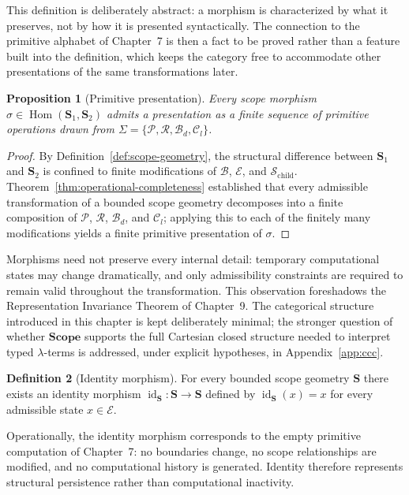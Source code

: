 \documentclass[11pt,twoside,openright]{book}
\numberwithin{equation}{chapter}
\theoremstyle{definition}
\newtheorem{definition}{Definition}[chapter]
\theoremstyle{plain}
\newtheorem{proposition}[definition]{Proposition}
\theoremstyle{remark}
\theoremstyle{definition}
\newcommand{\CatScope}{\mathbf{Scope}}
\newcommand{\Scope}{\mathbf{S}}
\newcommand{\ScopeMorph}{\sigma}
\newcommand{\Alphabet}{\Sigma}
\newcommand{\Pop}{\mathcal{P}}
\newcommand{\Refuse}{\mathcal{R}}
\newcommand{\Bind}{\mathcal{B}_d}
\newcommand{\Collapse}{\mathcal{C}_l}
\newcommand{\ScopeAlphabet}{\Alphabet=\{\Pop,\Refuse,\Bind,\Collapse\}}
\newcommand{\Boundary}{\mathcal{B}}
\newcommand{\Interior}{\mathcal{E}}
\newcommand{\Children}{\mathcal{S}_{\mathrm{child}}}
\DeclareMathOperator{\Hom}{Hom}
\begin{document}
This definition is deliberately abstract: a morphism is characterized by
what it preserves, not by how it is presented syntactically. The
connection to the primitive alphabet of Chapter~7 is then a fact to be
proved rather than a feature built into the definition, which keeps the
category free to accommodate other presentations of the same
transformations later.

\begin{proposition}[Primitive presentation]
\label{prop:primitive-presentation}
Every scope morphism $\ScopeMorph\in\Hom(\Scope_1,\Scope_2)$ admits a
presentation as a finite sequence of primitive operations drawn from
$\ScopeAlphabet$.
\end{proposition}

\begin{proof}
By Definition~\ref{def:scope-geometry}, the structural difference between
$\Scope_1$ and $\Scope_2$ is confined to finite modifications of
$\Boundary$, $\Interior$, and $\Children$. Theorem~\ref{thm:operational-completeness}
established that every admissible transformation of a bounded scope
geometry decomposes into a finite composition of $\Pop$, $\Refuse$,
$\Bind$, and $\Collapse$; applying this to each of the finitely many
modifications yields a finite primitive presentation of $\ScopeMorph$.
\end{proof}

Morphisms need not preserve every internal detail: temporary
computational states may change dramatically, and only admissibility
constraints are required to remain valid throughout the transformation.
This observation foreshadows the Representation Invariance Theorem of
Chapter~9. The categorical structure introduced in this chapter is kept
deliberately minimal; the stronger question of whether $\CatScope$
supports the full Cartesian closed structure needed to interpret typed
$\lambda$-terms is addressed, under explicit hypotheses, in
Appendix~\ref{app:ccc}.

\begin{definition}[Identity morphism]
For every bounded scope geometry $\Scope$ there exists an identity
morphism $\operatorname{id}_{\Scope}:\Scope\to\Scope$ defined by
$\operatorname{id}_{\Scope}(x)=x$ for every admissible state $x\in\Interior$.
\end{definition}

Operationally, the identity morphism corresponds to the empty primitive
computation of Chapter~7: no boundaries change, no scope relationships
are modified, and no computational history is generated. Identity
therefore represents structural persistence rather than computational
inactivity.
\end{document}

